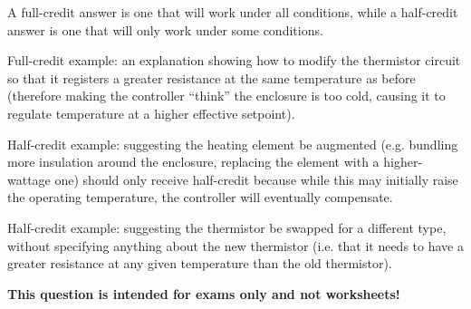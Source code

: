 





A full-credit answer is one that will work under all conditions, while a half-credit answer is one that will only work under some conditions.

\vskip 10pt

Full-credit example: an explanation showing how to modify the thermistor circuit so that it registers a greater resistance at the same temperature as before (therefore making the controller ``think'' the enclosure is too cold, causing it to regulate temperature at a higher effective setpoint).

Half-credit example: suggesting the heating element be augmented (e.g. bundling more insulation around the enclosure, replacing the element with a higher-wattage one) should only receive half-credit because while this may initially raise the operating temperature, the controller will eventually compensate.

Half-credit example: suggesting the thermistor be swapped for a different type, without specifying anything about the new thermistor (i.e. that it needs to have a greater resistance at any given temperature than the old thermistor).







{\bf This question is intended for exams only and not worksheets!}



